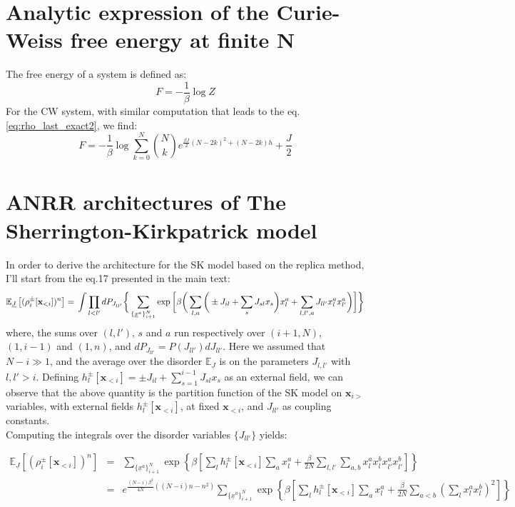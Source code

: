 \documentclass[10pt, notitlepage]{revtex4-2}
\begin{document}
\section{Analytic expression of the Curie-Weiss free energy at finite N}
The free energy of a system is defined as:
\begin{equation}
F = -\frac{1}{\beta} \log Z
\end{equation}
For the CW system, with similar computation that leads to the eq.\ref{eq:rho_last_exact2}, we find:
\begin{equation}
F = -\frac{1}{\beta}\log \sum_{k=0}^{N} \binom{N}{k}e^{\frac{\beta J}{2}\left(N-2k\right)^{2}+\left(N-2k\right)h}  + \frac{J}{2}
\end{equation}

\section{ANRR architectures of The Sherrington-Kirkpatrick model}
In order to derive the architecture for the SK model based on the replica method, I'll start from the eq.17 presented in the main text:
\begin{equation}
\mathbb{E}_{\underline{J}}\left[(\rho_i^{\pm}[\mathbf{x}_{<i}])^n \right]  = \\
\int \prod_{l<l'} dP_{J_{ll'}} \bigg\{ 
\sum_{\{\underline{x}^{a}\}_{i+1}^N} \exp\bigg[\beta \bigg(
\sum_{l,a}\bigg( \pm J_{il} + \sum_{s} J_{sl} x_s \bigg) x_l^{a} + 
\sum_{l,l', a} J_{ll'} x_l^{a} x_{l'}^{a}
\bigg)  \bigg] 
\bigg\}
\end{equation}
where, the sums over $(l,l')$, $s$ and $a$ run respectively over $(i+1,N)$, $(1,i-1)$ and $(1,n)$, and $dP_{J_{ll'}}=P(J_{ll'})dJ_{ll'}$. Here we assumed that $N-i \gg 1$, and the average over the disorder $\mathbb{E}_{\underline{J}}$ is on the parameters $J_{l,l'}$ with $l,l'>i$. Defining $h_l^{\pm}[\mathbf{x}_{<i}] =\pm J_{il} + \sum_{s=1}^{i-1} J_{sl} x_s$ as an external field, we can observe that the above quantity is the partition function of the SK model on $\mathbf{x}_{i>}$ variables, with external fields $h_l^{\pm}[\mathbf{x}_{<i}]$, at fixed $\mathbf{x}_{<i}$, and $J_{ll'}$ as coupling constants. \\  
Computing the integrals over the disorder variables $\{J_{ll'}\}$ yields:
\begin{widetext}
\begin{eqnarray}
\mathbb{E}_{\underline{J}}\left[(\rho_i^{\pm}[\mathbf{x}_{<i}])^n \right] & = & 
\sum_{\{\underline{x}^{a}\}_{i+1}^N} 
\exp\left\{\beta \left[
\sum_{l} h_l^{\pm}[\mathbf{x}_{<i}] \sum_{a} x_l^{a} +\frac{\beta}{2N} \sum_{l,l'} \sum_{a,b} x_l^{a} x_l^{b} x_{l'}^{a}x_{l'}^{b} \right]  \right\} \\
& = & e^{ \frac{(N-i) \beta^2}{4N}((N-i)n-n^2) } 
\sum_{\{\underline{x}^{a}\}_{i+1}^N} 
\exp\left\{\beta \left[
\sum_{l} h_l^{\pm}[\mathbf{x}_{<i}] \sum_{a} x_l^{a} +\frac{\beta}{2N} \sum_{a<b} \left( \sum_{l}  x_l^{a} x_l^{b} \right)^2 \right]  \right\}
\end{eqnarray}
\end{widetext}
\end{document}
